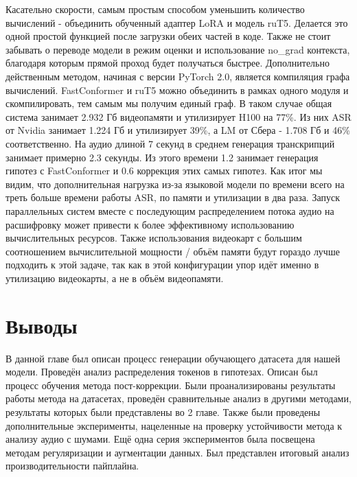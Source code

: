 Касательно скорости, самым простым способом уменьшить количество вычислений - объединить обученный адаптер LoRA и модель ruT5.
Делается это одной простой функцией после загрузки обеих частей в коде.
Также не стоит забывать о переводе модели в режим оценки и использование no\_grad контекста, благодаря которым прямой проход будет получаться быстрее.
Дополнительно действенным методом, начиная с версии PyTorch 2.0, является компиляция графа вычислений.
FastConformer и ruT5 можно объединить в рамках одного модуля и скомпилировать, тем самым мы получим единый граф.
В таком случае общая система занимает 2.932 Гб видеопамяти и утилизирует H100 на 77\%.
Из них ASR от Nvidia занимает 1.224 Гб и утилизирует 39\%, а LM от Сбера - 1.708 Гб и 46\% соответственно.
На аудио длиной 7 секунд в среднем генерация транскрипций занимает примерно 2.3 секунды.
Из этого времени 1.2 занимает генерация гипотез с FastConformer и 0.6 коррекция этих самых гипотез.
Как итог мы видим, что дополнительная нагрузка из-за языковой модели по времени всего на треть больше времени работы ASR, по памяти и утилизации в два раза.
Запуск параллельных систем вместе с последующим распределением потока аудио на расшифровку может привести к более эффективному использованию вычислительных ресурсов.
Также использования видеокарт с большим соотношением вычислительной мощности / объём памяти будут гораздо лучше подходить к этой задаче, так как в этой конфигурации упор идёт именно в утилизацию видеокарты, а не в объём видеопамяти.

\section{Выводы}
В данной главе был описан процесс генерации обучающего датасета для нашей модели.
Проведён анализ распределения токенов в гипотезах.
Описан был процесс обучения метода пост-коррекции.
Были проанализированы результаты работы метода на датасетах, проведён сравнительные анализ в другими методами, результаты которых были представлены во 2 главе.
Также были проведены дополнительные эксперименты, нацеленные на проверку устойчивости метода к анализу аудио с шумами.
Ещё одна серия экспериментов была посвещена методам регуляризации и аугментации данных.
Был представлен итоговый анализ производительности пайплайна.
